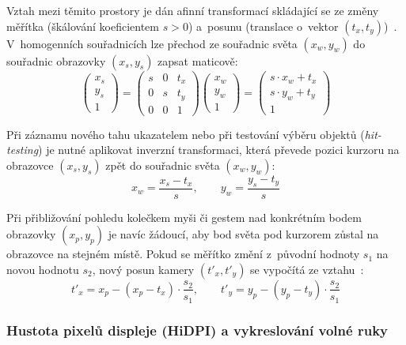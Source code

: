 \documentclass[12pt, a4paper, oneside]{article}
\begin{document}
Vztah mezi těmito prostory je dán afinní transformací skládající se ze změny měřítka (škálování koeficientem $s > 0$) a~posunu (translace o~vektor $(t_x, t_y)$)~\cite{marschner2021cg, mdn_canvas}. V~homogenních souřadnicích lze přechod ze souřadnic světa $(x_w, y_w)$ do souřadnic obrazovky $(x_s, y_s)$ zapsat maticově:
\begin{equation}
    \begin{pmatrix} x_s \\ y_s \\ 1 \end{pmatrix}
    =
    \begin{pmatrix}
        s & 0 & t_x \\
        0 & s & t_y \\
        0 & 0 & 1
    \end{pmatrix}
    \begin{pmatrix} x_w \\ y_w \\ 1 \end{pmatrix}
    =
    \begin{pmatrix}
        s \cdot x_w + t_x \\
        s \cdot y_w + t_y \\
        1
    \end{pmatrix}
    \label{eq:world_to_screen}
\end{equation}

Při záznamu nového tahu ukazatelem nebo při testování výběru objektů (\textit{hit-testing}) je nutné aplikovat inverzní transformaci, která převede pozici kurzoru na obrazovce $(x_s, y_s)$ zpět do souřadnic světa $(x_w, y_w)$:
\begin{equation}
    x_w = \frac{x_s - t_x}{s}, \qquad y_w = \frac{y_s - t_y}{s}
    \label{eq:screen_to_world}
\end{equation}

Při přibližování pohledu kolečkem myši či gestem nad konkrétním bodem obrazovky $(x_p, y_p)$ je navíc žádoucí, aby bod světa pod kurzorem zůstal na obrazovce na stejném místě. Pokud se měřítko změní z~původní hodnoty $s_1$ na novou hodnotu $s_2$, nový posun kamery $(t'_{x}, t'_{y})$ se vypočítá ze vztahu~\cite{marschner2021cg}:
\begin{equation}
    t'_x = x_p - (x_p - t_x) \cdot \frac{s_2}{s_1}, \qquad
    t'_y = y_p - (y_p - t_y) \cdot \frac{s_2}{s_1}
    \label{eq:zoom_at_point}
\end{equation}

\subsubsection{Hustota pixelů displeje (HiDPI) a vykreslování volné ruky}
\label{sec:teorie_hidpi_freehand}
\end{document}
